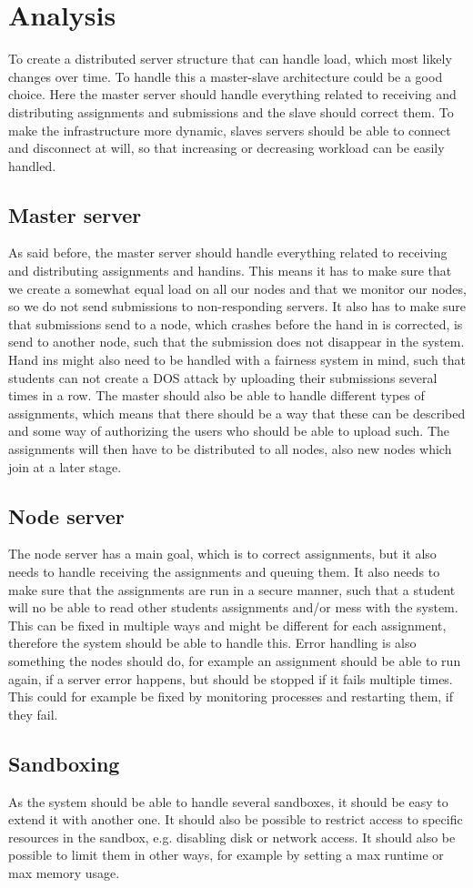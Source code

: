 \section*{Analysis}
To create a distributed server structure that can handle load, which most
likely changes over time. To handle this a master-slave architecture could be
a good choice. Here the master server should handle everything related to
receiving and distributing assignments and submissions and the slave should
correct them. To make the infrastructure more dynamic, slaves servers should be
able to connect and disconnect at will, so that increasing or decreasing
workload can be easily handled.

\subsection*{Master server}
As said before, the master server should handle everything related to receiving
and distributing assignments and handins. This means it has to make sure that we
create a somewhat equal load on all our nodes and that we monitor our nodes, so
we do not send submissions to non-responding servers. It also has to make sure
that submissions send to a node, which crashes before the hand in is corrected,
is send to another node, such that the submission does not disappear in the
system.
Hand ins might also need to be handled with a fairness system in mind, such that
students can not create a DOS attack by uploading their submissions several
times in a row.
The master should also be able to handle different types of assignments, which
means that there should be a way that these can be described and some way of
authorizing the users who should be able to upload such.
The assignments will then have to be distributed to all nodes, also new nodes
which join at a later stage.

\subsection*{Node server}
The node server has a main goal, which is to correct assignments, but it also
needs to handle receiving the assignments and queuing them. It also needs to
make sure that the assignments are run in a secure manner, such that a student
will no be able to read other students assignments and/or mess with the system.
This can be fixed in multiple ways and might be different for each assignment,
therefore the system should be able to handle this.
Error handling is also something the nodes should do, for example an assignment
should be able to run again, if a server error happens, but should be stopped if
it fails multiple times. This could for example be fixed by monitoring processes
and restarting them, if they fail.

\subsection*{Sandboxing}
As the system should be able to handle several sandboxes, it should be easy to
extend it with another one. It should also be possible to restrict access to
specific resources in the sandbox, e.g. disabling disk or network access.
It should also be possible to limit them in other ways, for example by setting
a max runtime or max memory usage.
